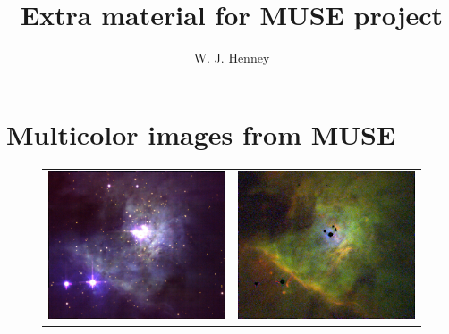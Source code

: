 \documentclass[preprint]{aastex}
\begin{document}
\title{Extra material for MUSE project}
\author{W. J. Henney}

\section{Multicolor images from MUSE}
\label{sec:mult-imag-from}

\begin{figure}
  \centering
  \begin{tabular}{@{}l@{}l@{}}
    \includegraphics{rgb-continuum}
    & \includegraphics{rgb-chlorine-234} \\

\end{tabular}
\end{figure}
\end{document}
